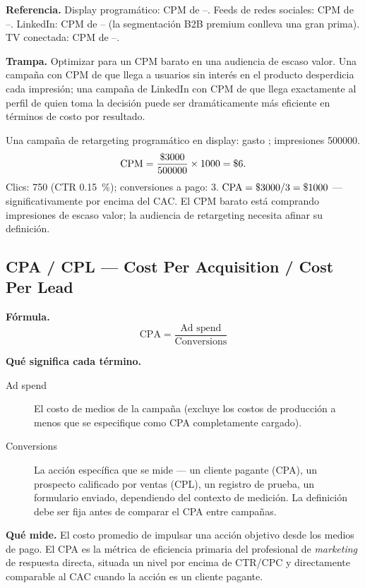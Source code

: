 \textbf{Referencia.} Display programático: CPM de --. Feeds de redes
sociales: CPM de --. LinkedIn: CPM de -- (la
segmentación B2B premium conlleva una gran prima). TV conectada: CPM de
--.

\textbf{Trampa.} Optimizar para un CPM barato en una audiencia de escaso valor. Una campaña
con CPM de  que llega a usuarios sin interés en el producto desperdicia cada
impresión; una campaña de LinkedIn con CPM de  que llega exactamente al perfil de
quien toma la decisión puede ser dramáticamente más eficiente en términos de costo por
resultado.

\begin{example}
Una campaña de retargeting programático en display: gasto ; impresiones
\num{500000}.
\[
  \mathrm{CPM} = \frac{\$\num{3000}}{500000} \times 1000 = \$\num{6}.
\]
Clics: \num{750} (CTR \qty{0.15}{\percent}); conversiones a pago: 3.
$\mathrm{CPA} = \$\num{3000}/3 = \$\num{1000}$ --- significativamente por encima del CAC.
El CPM barato está comprando impresiones de escaso valor; la audiencia de retargeting
necesita afinar su definición.
\end{example}


\subsection{CPA / CPL --- Cost Per Acquisition / Cost Per Lead}

\textbf{Fórmula.}
\[
  \mathrm{CPA} = \frac{\text{Ad spend}}{\text{Conversions}}
\]

\textbf{Qué significa cada término.}
\begin{description}
  \item[Ad spend] El costo de medios de la campaña (excluye los costos de producción a
    menos que se especifique como CPA completamente cargado).
  \item[Conversions] La acción específica que se mide --- un cliente pagante (CPA), un
    prospecto calificado por ventas (CPL), un registro de prueba, un formulario enviado,
    dependiendo del contexto de medición. La definición debe ser fija antes de comparar el
    CPA entre campañas.
\end{description}

\textbf{Qué mide.} El costo promedio de impulsar una acción objetivo desde los medios de
pago. El CPA es la métrica de eficiencia primaria del profesional de \emph{marketing} de
respuesta directa, situada un nivel por encima de CTR/CPC y directamente comparable al CAC
cuando la acción es un cliente pagante.

